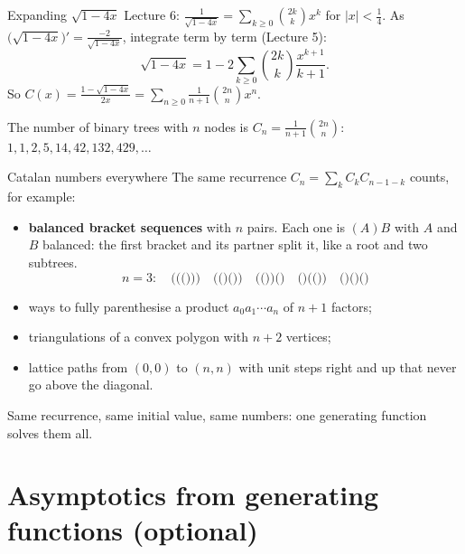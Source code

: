 \documentclass{wosm-slides}
\begin{document}
\begin{frame}{Expanding $\sqrt{1 - 4x}$}
  Lecture 6: $\frac{1}{\sqrt{1 - 4x}} = \sum_{k \ge 0} \binom{2k}{k} x^k$ for $|x| < \frac14$.
  As $\bigl(\sqrt{1 - 4x}\bigr)' = \frac{-2}{\sqrt{1-4x}}$, integrate term by term (Lecture 5):
  \[ \sqrt{1 - 4x} = 1 - 2 \sum_{k \ge 0} \binom{2k}{k} \frac{x^{k+1}}{k+1} . \]
  \pause
  So $C(x) = \frac{1 - \sqrt{1 - 4x}}{2x} = \sum_{n \ge 0} \frac{1}{n+1}\binom{2n}{n} x^n$.
  \pause
  \begin{theorem}
    \raggedright The number of binary trees with $n$ nodes is
    $C_n = \frac{1}{n+1}\binom{2n}{n}$: \ $1, 1, 2, 5, 14, 42, 132, 429, \dots$
  \end{theorem}
\end{frame}

\begin{frame}{Catalan numbers everywhere}
  The same recurrence $C_n = \sum_{k} C_k C_{n-1-k}$ counts, for example:
  \begin{itemize}
    \item \textbf{balanced bracket sequences} with $n$ pairs. Each one is $(A)B$ with $A$ and $B$
      balanced: the first bracket and its partner split it, like a root and two subtrees.
      \[ n = 3: \quad \texttt{((()))} \quad \texttt{(()())} \quad \texttt{(())()} \quad
         \texttt{()(())} \quad \texttt{()()()} \]
    \item ways to fully parenthesise a product $a_0 a_1 \cdots a_n$ of $n + 1$ factors;
    \item triangulations of a convex polygon with $n + 2$ vertices;
    \item lattice paths from $(0, 0)$ to $(n, n)$ with unit steps right and up that never go
      above the diagonal.
  \end{itemize}
  {\small Same recurrence, same initial value, same numbers: one generating function solves them all.\par}
\end{frame}

\section{Asymptotics from generating functions (optional)}
\end{document}
